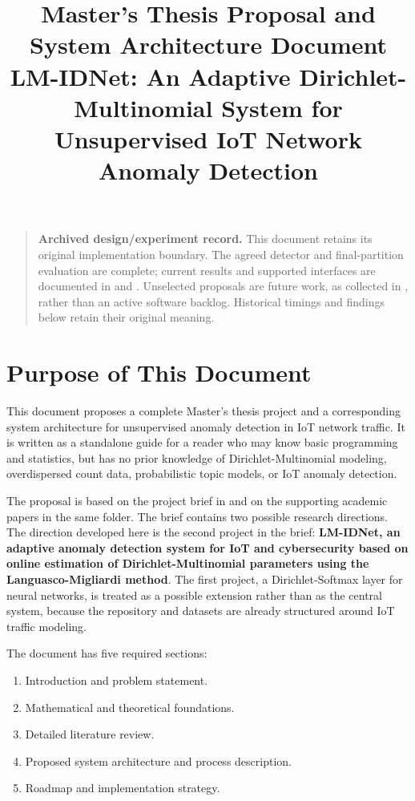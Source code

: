 \documentclass[11pt,a4paper]{article}
\title{Master's Thesis Proposal and System Architecture Document\\[0.5em]
\large LM-IDNet: An Adaptive Dirichlet-Multinomial System for Unsupervised IoT Network Anomaly Detection}
\author{}
\date{}
\begin{document}
\maketitle

\begin{quote}
\textbf{Archived design/experiment record.} This document retains its original
implementation boundary. The agreed detector and final-partition evaluation
are complete; current results and supported interfaces are documented in
 and
. Unselected proposals are future
work, as collected in , rather than an active software
backlog. Historical timings and findings below retain their original meaning.
\end{quote}

\tableofcontents
\newpage

\section*{Purpose of This Document}

This document proposes a complete Master's thesis project and a corresponding system architecture for unsupervised anomaly detection in IoT network traffic. It is written as a standalone guide for a reader who may know basic programming and statistics, but has no prior knowledge of Dirichlet-Multinomial modeling, overdispersed count data, probabilistic topic models, or IoT anomaly detection.

The proposal is based on the project brief in  and on the supporting academic papers in the same folder. The brief contains two possible research directions. The direction developed here is the second project in the brief: \textbf{LM-IDNet, an adaptive anomaly detection system for IoT and cybersecurity based on online estimation of Dirichlet-Multinomial parameters using the Languasco-Migliardi method}. The first project, a Dirichlet-Softmax layer for neural networks, is treated as a possible extension rather than as the central system, because the repository and datasets are already structured around IoT traffic modeling.

The document has five required sections:

\begin{enumerate}
  \item Introduction and problem statement.
  \item Mathematical and theoretical foundations.
  \item Detailed literature review.
  \item Proposed system architecture and process description.
  \item Roadmap and implementation strategy.
\end{enumerate}
\end{document}
